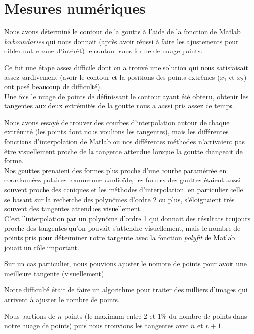 \documentclass[french]{article}
\begin{document}
\section{Mesures numériques}

Nous avons déterminé le contour de la goutte à l'aide de la fonction de Matlab \emph{bwboundaries} qui nous donnait (après avoir réussi à faire les ajustements pour cibler notre zone d'intérêt) le contour sous forme de nuage points.

Ce fut une étape assez difficile dont on a trouvé une solution qui nous satisfaisait assez tardivement (avoir le contour et la positions des points extrêmes ($x_{1}$ et $x_{2}$) ont posé beaucoup de difficulté).  \\

Une fois le nuage de points de définissant le contour ayant été obtenu, obtenir les tangentes aux deux extrémités de la goutte nous a aussi pris assez de temps.

Nous avons essayé de trouver des courbes d'interpolation autour de chaque extrémité (les points dont nous voulions les tangentes), mais les différentes fonctions d'interpolation de Matlab ou nos différentes méthodes n'arrivaient pas être visuellement proche de la tangente attendue lorsque la goutte changeait de forme.\\

Nos gouttes prenaient des formes plus proche d'une courbe paramétrée en coordonnées polaires comme une cardioïde, les formes des gouttes étaient aussi souvent proche des coniques et les méthodes d'interpolation, en particulier celle se basant sur la recherche des polynômes d'ordre 2 ou plus, s'éloignaient très souvent des tangentes attendues visuellement.\\

C'est l'interpolation par un polynôme d'ordre 1 qui donnait des résultats toujours proche des tangentes qu'on pouvait s'attendre visuellement, mais le nombre de points pris pour déterminer notre tangente avec la fonction \emph{polyfit} de Matlab jouait un rôle important.

Sur un cas particulier, nous pouvions ajuster le nombre de points pour avoir une meilleure tangente (visuellement).

Notre difficulté était de faire un algorithme pour traiter des milliers d'images qui arrivent à ajuster le nombre de points.

Nous partions de $n$ points (le maximum entre 2 et $1\%$ du nombre de points dans notre nuage de points) puis nous trouvions les tangentes avec $n$ et $n+1$.
\end{document}
